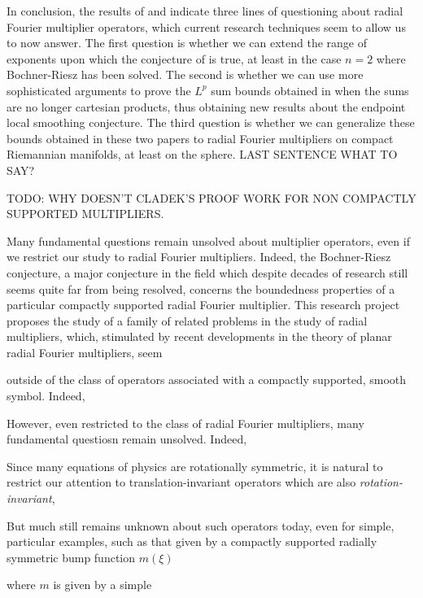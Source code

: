 \documentclass[12pt]{article}
\theoremstyle{plain}
\theoremstyle{remark}
\theoremstyle{definition}
\begin{document}
In conclusion, the results of \cite{HeoandNazarovandSeeger} and \cite{Cladek} indicate three lines of questioning about radial Fourier multiplier operators, which current research techniques seem to allow us to now answer. The first question is whether we can extend the range of exponents upon which the conjecture of \cite{GarrigosandSeeger} is true, at least in the case $n = 2$ where Bochner-Riesz has been solved. The second is whether we can use more sophisticated arguments to prove the $L^p$ sum bounds obtained in \cite{Cladek} when the sums are no longer cartesian products, thus obtaining new results about the endpoint local smoothing conjecture. The third question is whether we can generalize these bounds obtained in these two papers to radial Fourier multipliers on compact Riemannian manifolds, at least on the sphere. LAST SENTENCE WHAT TO SAY?



\newpage

TODO: WHY DOESN'T CLADEK'S PROOF WORK FOR NON COMPACTLY SUPPORTED MULTIPLIERS.

Many fundamental questions remain unsolved about multiplier operators, even if we restrict our study to radial Fourier multipliers. Indeed, the Bochner-Riesz conjecture, a major conjecture in the field which despite decades of research still seems quite far from being resolved, concerns the boundedness properties of a particular compactly supported radial Fourier multiplier. This research project proposes the study of a family of related problems in the study of radial multipliers, which, stimulated by recent developments in the theory of planar radial Fourier multipliers, seem 

outside of the class of operators associated with a compactly supported, smooth symbol. Indeed, 

However, even restricted to the class of radial Fourier multipliers, many fundamental questiosn remain unsolved. Indeed, 

Since many equations of physics are rotationally symmetric, it is natural to restrict our attention to translation-invariant operators which are also \emph{rotation-invariant}, 


But much still remains unknown about such operators today, even for simple, particular examples, such as that given by a compactly supported radially symmetric bump function $m(\xi)$

 where $m$ is given by a simple 
\end{document}
